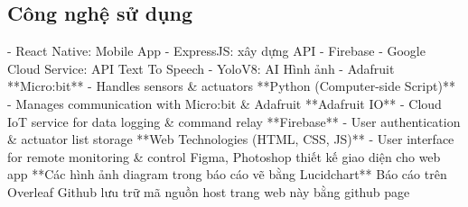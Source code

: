 \subsection{Công nghệ sử dụng}
- React Native: Mobile App
- ExpressJS: xây dựng API
- Firebase
- Google Cloud Service: API Text To Speech
- YoloV8: AI Hình ảnh
- Adafruit
**Micro:bit** - Handles sensors \& actuators
**Python (Computer-side Script)** - Manages communication with Micro:bit \& Adafruit
**Adafruit IO** - Cloud IoT service for data logging \& command relay
**Firebase** - User authentication \& actuator list storage
**Web Technologies (HTML, CSS, JS)** - User interface for remote monitoring \& control
Figma, Photoshop thiết kế giao diện cho web app
**Các hình ảnh diagram trong báo cáo vẽ bằng Lucidchart**
Báo cáo trên Overleaf
Github lưu trữ mã nguồn
host trang web này bằng github page